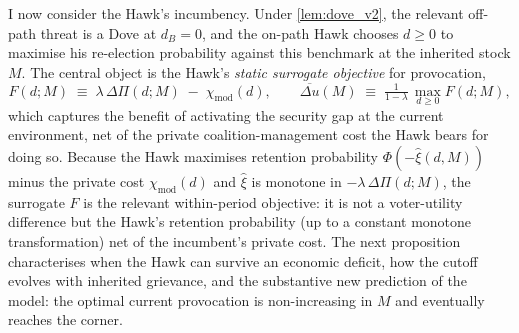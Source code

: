 \documentclass[11pt,twoside]{extarticle}
\begin{document}
I now consider the Hawk's incumbency. Under \autoref{lem:dove_v2}, the relevant off-path threat is a Dove at $d_B=0$, and the on-path Hawk chooses $d\ge 0$ to maximise his re-election probability against this benchmark at the inherited stock $M$. The central object is the Hawk's \emph{static surrogate objective} for provocation,
\begin{equation}\label{eq:dubar_v2}
    F(d;M)\;\equiv\;\lambda\,\Delta\Pi(d;M)\;-\;\chi_{\mathrm{mod}}(d),\qquad\overline{\Delta u}(M)\;\equiv\;\tfrac{1}{1-\lambda}\,\max_{d\ge 0}F(d;M),
\end{equation}
which captures the benefit of activating the security gap at the current environment, net of the private coalition-management cost the Hawk bears for doing so. Because the Hawk maximises retention probability $\Phi(-\hat\xi(d,M))$ minus the private cost $\chi_{\mathrm{mod}}(d)$ and $\hat\xi$ is monotone in $-\lambda\,\Delta\Pi(d;M)$, the surrogate $F$ is the relevant within-period objective: it is not a voter-utility difference but the Hawk's retention probability (up to a constant monotone transformation) net of the incumbent's private cost. The next proposition characterises when the Hawk can survive an economic deficit, how the cutoff evolves with inherited grievance, and the substantive new prediction of the model: the optimal current provocation is non-increasing in $M$ and eventually reaches the corner.
\end{document}
